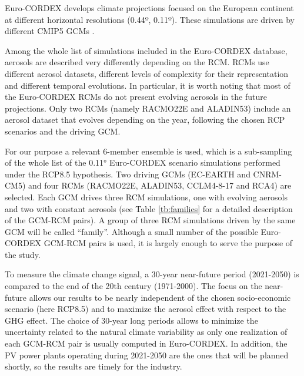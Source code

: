 
Euro-CORDEX develops climate projections focused on the European continent at different horizontal resolutions (0.44º, 0.11º). These simulations are driven by different CMIP5 GCMs \cite*{Taylor2012}.

Among the whole list of simulations included in the Euro-CORDEX database, aerosols are described very differently depending on the RCM. RCMs use different aerosol datasets, different levels of complexity for their representation and different temporal evolutions. In particular, it is worth noting that most of the Euro-CORDEX RCMs do not present evolving aerosols in the future projections. Only two RCMs (namely RACMO22E and ALADIN53) include an aerosol dataset that evolves depending on the year, following the chosen RCP scenarios and the driving GCM.

For our purpose a relevant 6-member ensemble is used, which is a sub-sampling of the whole list of the 0.11° Euro-CORDEX scenario simulations performed under the RCP8.5 hypothesis. Two driving GCMs (EC-EARTH and CNRM-CM5) and four RCMs (RACMO22E, ALADIN53, CCLM4-8-17 and RCA4) are selected. Each GCM drives three RCM simulations, one with evolving aerosols and two with constant aerosols (see Table \ref{tb:families} for a detailed description of the GCM-RCM pairs). A group of three RCM simulations driven by the same GCM will be called ``family''. Although a small number of the possible Euro-CORDEX GCM-RCM pairs is used, it is largely enough to serve the purpose of the study.

To measure the climate change signal, a 30-year near-future period (2021-2050) is compared to the end of the 20th century (1971-2000). The focus on the near-future allows our results to be nearly independent of the chosen socio-economic scenario (here RCP8.5) and to maximize the aerosol effect with respect to the GHG effect. The choice of 30-year long periods allows to minimize the uncertainty related to the natural climate variability as only one realization of each GCM-RCM pair is usually computed in Euro-CORDEX. In addition, the PV power plants operating during 2021-2050 are the ones that will be planned shortly, so the results are timely for the industry.

